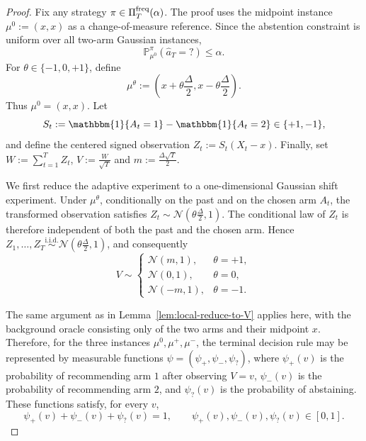 \documentclass[10pt]{article}
\theoremstyle{plain}
\begin{document}
\begin{proof} \label{sec:proof_thm4}
Fix any strategy $\pi\in\Pi_T^{\rm freq}(\alpha)$. The proof uses
the midpoint instance $\mu^0:=(x,x)$
as a change-of-measure reference. Since the abstention constraint is uniform over
all two-arm Gaussian instances,
\begin{equation}
\label{eq:freq-abst-midpoint}
    \mathbb P_{\mu^0}^\pi(\hat a_T=?)\le \alpha .
\end{equation}
For $\theta\in\{-1,0,+1\}$, define
\[
    \mu^\theta
    :=
    \left(
        x+\theta\frac{\Delta}{2},
        x-\theta\frac{\Delta}{2}
    \right).
\]
Thus $\mu^0=(x,x)$. Let
\[
    S_t:=\mathbbm{1}\{A_t=1\}-\mathbbm{1}\{A_t=2\}\in\{+1,-1\},
\]
and define the centered signed observation $Z_t:=S_t(X_t-x)$.
Finally, set $W:=\sum_{t=1}^T Z_t$, $V:=\frac{W}{\sqrt T}$ and $m:=\frac{\Delta\sqrt T}{2}$.


We first reduce the adaptive experiment to a one-dimensional Gaussian shift
experiment. Under $\mu^\theta$, conditionally on the past and on the chosen arm
$A_t$, the transformed observation satisfies $Z_t\sim \mathcal N\!\left(\theta\frac{\Delta}{2},1\right)$.
The conditional law of $Z_t$ is therefore independent of both the past and the
chosen arm. Hence
    $Z_1,\ldots,Z_T
    \overset{\mathrm{i.i.d.}}{\sim}
    \mathcal N\!\left(\theta\frac{\Delta}{2},1\right)$,
and consequently
\[
    V\sim
    \begin{cases}
        \mathcal N(m,1), & \theta=+1,\\
        \mathcal N(0,1), & \theta=0,\\
        \mathcal N(-m,1), & \theta=-1.
    \end{cases}
\]

The same argument as in Lemma~\ref{lem:local-reduce-to-V} applies here, with the background oracle consisting only of the two arms and their midpoint $x$. Therefore, for the three instances
$\mu^0,\mu^+,\mu^-$, the terminal decision rule may be represented by measurable
functions $\psi = (\psi_+, \psi_-,\psi_?)$,
where $\psi_+(v)$ is the probability of recommending arm $1$ after observing
$V=v$, $\psi_-(v)$ is the probability of recommending arm $2$, and
$\psi_?(v)$ is the probability of abstaining. These functions satisfy, for every $v$,
\[
    \psi_+(v)+\psi_-(v)+\psi_?(v)=1,
    \qquad
    \psi_+(v),\psi_-(v),\psi_?(v)\in[0,1].
\]


\end{proof}
\end{document}
